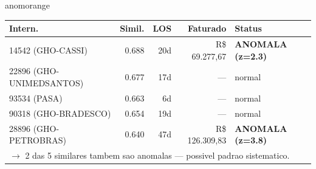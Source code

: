 \documentclass[a4paper,10pt]{article}
\begin{document}
\begin{anomalycard}[Internacao 167286 | GHO-PETROBRAS | ALTO (z=3.69)]{anomorange}
\begin{tabular}{l r r r l}\toprule\textbf{Intern.} & \textbf{Simil.} & \textbf{LOS} & \textbf{Faturado} & \textbf{Status} \\\midrule
14542 (GHO-CASSI) & 0.688 & 20d & R\$ 69.277,67 & \textcolor{anomred}{\textbf{ANOMALA (z=2.3)}} \\
22896 (GHO-UNIMEDSANTOS) & 0.677 & 17d & --- & \textcolor{jcubeblue}{normal} \\
93534 (PASA) & 0.663 & 6d & --- & \textcolor{jcubeblue}{normal} \\
90318 (GHO-BRADESCO) & 0.654 & 19d & --- & \textcolor{jcubeblue}{normal} \\
28896 (GHO-PETROBRAS) & 0.640 & 47d & R\$ 126.309,83 & \textcolor{anomred}{\textbf{ANOMALA (z=3.8)}} \\
\multicolumn{5}{l}{\textcolor{anomred}{\small $\rightarrow$ 2 das 5 similares tambem sao anomalas --- possivel padrao sistematico.}} \\
\bottomrule\end{tabular}



\end{anomalycard}

\newpage
\end{document}
